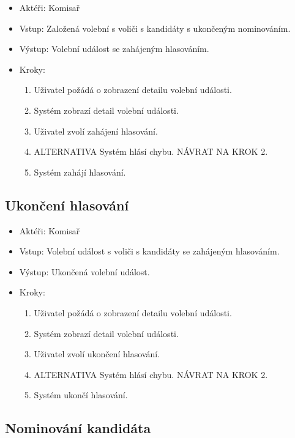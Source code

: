 \documentclass[11pt,twoside,a4paper]{book}
\begin{document}
\begin{itemize}
\item Aktéři: Komisař
\item Vstup: Založená volební s voliči s kandidáty s ukončeným nominováním.
\item Výstup: Volební událost se zahájeným hlasováním.
\item Kroky:
	\begin{enumerate}
		\item Uživatel požádá o zobrazení detailu volební události.
		\item Systém zobrazí detail volební události.
		\item Uživatel zvolí zahájení hlasování.		
		\item ALTERNATIVA Systém hlásí chybu. NÁVRAT NA KROK 2.
		\item Systém zahájí hlasování.
	\end{enumerate}
\end{itemize}

\subsection{Ukončení hlasování}

\begin{itemize}
\item Aktéři: Komisař
\item Vstup: Volební událost s voliči s kandidáty se zahájeným hlasováním.
\item Výstup: Ukončená volební událost.
\item Kroky:
	\begin{enumerate}
		\item Uživatel požádá o zobrazení detailu volební události.
		\item Systém zobrazí detail volební události.
		\item Uživatel zvolí ukončení hlasování.		
		\item ALTERNATIVA Systém hlásí chybu. NÁVRAT NA KROK 2.
		\item Systém ukončí hlasování.
	\end{enumerate}
\end{itemize}

\subsection{Nominování kandidáta}
\end{document}
